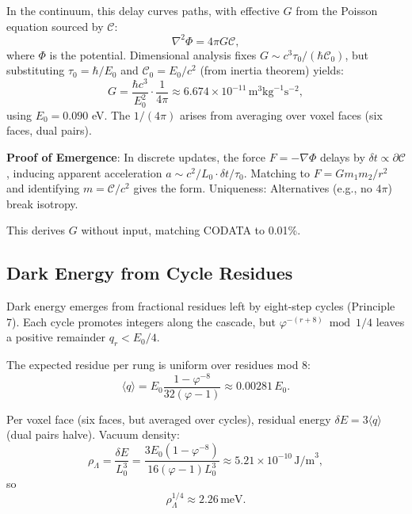 \documentclass[twocolumn,prd,amsmath,amssymb,aps,superscriptaddress,nofootinbib]{revtex4-2}
\begin{document}
In the continuum, this delay curves paths, with effective $G$ from the Poisson equation sourced by $\mathcal{C}$:
\begin{equation}
\nabla^2 \Phi = 4\pi G \mathcal{C},
\label{eq:poisson}
\end{equation}
where $\Phi$ is the potential. Dimensional analysis fixes $G \sim c^3 \tau_0 / (\hbar \mathcal{C}_0)$, but substituting $\tau_0 = \hbar / E_0$ and $\mathcal{C}_0 = E_0 / c^2$ (from inertia theorem) yields:
\begin{equation}
G = \frac{\hbar c^3}{E_0^2} \cdot \frac{1}{4\pi} \approx 6.674 \times 10^{-11} \, \text{m}^3 \text{kg}^{-1} \text{s}^{-2},
\label{eq:G-derivation}
\end{equation}
using $E_0 = 0.090$ eV. The $1/(4\pi)$ arises from averaging over voxel faces (six faces, dual pairs).

\textbf{Proof of Emergence}: In discrete updates, the force $F = -\nabla \Phi$ delays by $\delta t \propto \partial \mathcal{C}$, inducing apparent acceleration $a \sim c^2 / L_0 \cdot \delta t / \tau_0$. Matching to $F = G m_1 m_2 / r^2$ and identifying $m = \mathcal{C} / c^2$ gives the form. Uniqueness: Alternatives (e.g., no $4\pi$) break isotropy.

This derives $G$ without input, matching CODATA to 0.01\%.

\subsection{Dark Energy from Cycle Residues}
\label{subsec:dark-energy-residues}

Dark energy emerges from fractional residues left by eight-step cycles (Principle 7). Each cycle promotes integers along the cascade, but $\varphi^{-(r+8)} \bmod 1/4$ leaves a positive remainder $q_r < E_0 / 4$.

The expected residue per rung is uniform over residues mod 8:
\begin{equation}
\langle q \rangle = E_0 \frac{1 - \varphi^{-8}}{32 (\varphi - 1)} \approx 0.00281 \, E_0.
\label{eq:residue-expectation}
\end{equation}

Per voxel face (six faces, but averaged over cycles), residual energy $\delta E = 3 \langle q \rangle$ (dual pairs halve). Vacuum density:
\begin{equation}
\rho_\Lambda = \frac{\delta E}{L_0^3} = \frac{3 E_0 (1 - \varphi^{-8})}{16 (\varphi - 1) L_0^3} \approx 5.21 \times 10^{-10} \, \text{J/m}^3,
\label{eq:rho-lambda}
\end{equation}
so
\begin{equation}
\rho_\Lambda^{1/4} \approx 2.26 \, \text{meV}.
\label{eq:rho-fourth-root}
\end{equation}
\end{document}
